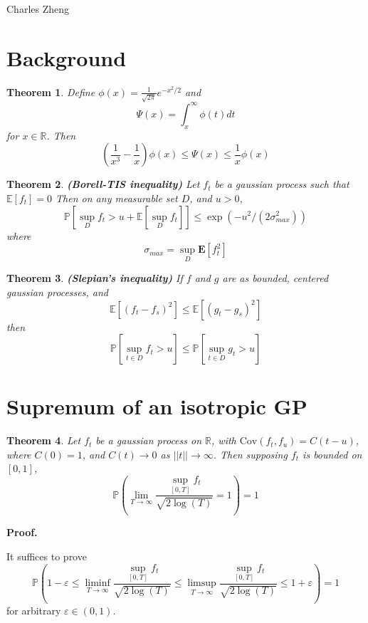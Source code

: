 \documentclass[11pt]{article}
\begin{document}
\newcommand{\tr}{\text{tr}}
\newcommand{\E}{\textbf{E}}
\newcommand{\diag}{\text{diag}}
\newcommand{\argmax}{\text{argmax}}
\newcommand{\Cov}{\text{Cov}}
\newcommand{\Var}{\text{Var}}
\newtheorem{theorem}{Theorem}

Charles Zheng

\section{Background}

\begin{theorem}
\label{bound}
Define $\phi(x) = \frac{1}{\sqrt{2\pi}}e^{-x^2/2}$ and
\[
\Psi(x) = \int_x^\infty \phi(t) dt
\]
for $x \in \mathbb{R}$.
Then
\[
\left(\frac{1}{x^3}-\frac{1}{x}\right) \phi(x) \leq \Psi(x) \leq \frac{1}{x}\phi(x)
\]
\end{theorem}

\begin{theorem}
\label{bt}
\textbf{(Borell-TIS inequality)}
Let $f_t$ be a gaussian process such that $\mathbb{E}[f_t] = 0$
Then on any measurable set $D$, and $u > 0$, 
\[
\mathbb{P}[\sup_D f_t > u + \mathbb{E}[\sup_D f_t]] \leq \exp(-u^2/(2\sigma_{max}^2))
\]
where
\[
\sigma_{max} = \sup_D \E[f_t^2]
\]
\end{theorem}

\begin{theorem}\label{slepian}
\textbf{(Slepian's inequality)}
If $f$ and $g$ are as bounded, centered gaussian processes, and
\[
\mathbb{E}[(f_t-f_s)^2] \leq \mathbb{E}[(g_t-g_s)^2]
\]
then
\[
\mathbb{P}[\sup_{t \in D} f_t  > u] \leq \mathbb{P}[\sup_{t \in D} g_t  > u]
\]
\end{theorem}

\section{Supremum of an isotropic GP}

\begin{theorem}
Let $f_t$ be a gaussian process on $\mathbb{R}$, with $\Cov(f_t,f_u)
= C(t-u)$, where $C(0) = 1$, and $C(t) \to 0$ as $||t|| \to \infty$.
Then supposing $f_t$ is bounded on $[0,1]$,
\[
\mathbb{P}\left(\lim_{T \to \infty}\frac{\sup_{[0,T]}
    f_t}{\sqrt{2 \log(T)}} = 1
\right) = 1
\]
\end{theorem}

\noindent\textbf{Proof.}

It suffices to prove
\[
\mathbb{P}\left( 1-\varepsilon \leq \liminf_{T \to \infty}\frac{\sup_{[0,T]}
    f_t}{\sqrt{2 \log(T)}} \leq \limsup_{T \to \infty}\frac{\sup_{[0,T]}
    f_t}{\sqrt{2 \log(T)}} \leq 1+\varepsilon \right) = 1
\]
for arbitrary $\varepsilon \in (0,1)$.
\end{document}

